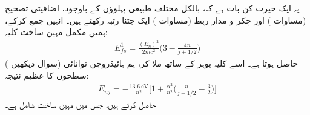 یہ ایک حیرت کن بات ہے کہ، بالکل مختلف طبیعی پہلوؤں کے باوجود، اضافیتی تصحیح (مساوات ) اور چکر و مدار ربط (مساوات ) ایک جتنا رتبہ  رکھتے ہیں۔ انہیں جمع کرکے، ہمیں مکمل مہین ساخت کلیہ:
\begin{align}\label{مساوات_غیر_مضطرب_اضافیتی_تصحیح_چکرومدار_ربط}
E_{fs}^1 = \frac{(E_n)^2}{2mc^2} \big ( 3 - \frac{4n}{j + 1/2} \big )
\end{align}
 ( سوال  دیکھیں) حاصل ہوتا ہے۔ اسے کلیہ بوہر کے ساتھ ملا کر، ہم ہائیڈروجن توانائی سطحوں کا عظیم نتیجہ:
\begin{align}\label{مساوات_غیر_مضطرب_مجموعی_نتیجہ_مہین}
E_{nj} = - \frac{\SI{13.6}{\electronvolt}}{n^2} \big [ 1 + \frac{\alpha^2}{n^2} \big ( \frac{n}{j + 1/2} - \frac{3}{2} \big ) \big ]
\end{align}
حاصل کرتے ہیں، جس میں مہین ساخت شامل ہے۔ 

